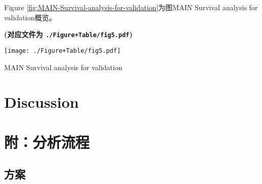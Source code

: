 \documentclass[
]{article}
\begin{document}
Figure \ref{fig:MAIN-Survival-analysis-for-validation}为图MAIN Survival analysis for validation概览。

\textbf{(对应文件为 \texttt{./Figure+Table/fig5.pdf})}

\def\@captype{figure}
\begin{center}
\texttt{[image: ./Figure+Table/fig5.pdf]}
\caption{MAIN Survival analysis for validation}\label{fig:MAIN-Survival-analysis-for-validation}
\end{center}

\hypertarget{discussion}{%
\section{Discussion}\label{discussion}}

\hypertarget{ux9644ux5206ux6790ux6d41ux7a0b}{%
\section{附：分析流程}\label{ux9644ux5206ux6790ux6d41ux7a0b}}

\hypertarget{ux65b9ux6848}{%
\subsection{方案}\label{ux65b9ux6848}}
\end{document}
